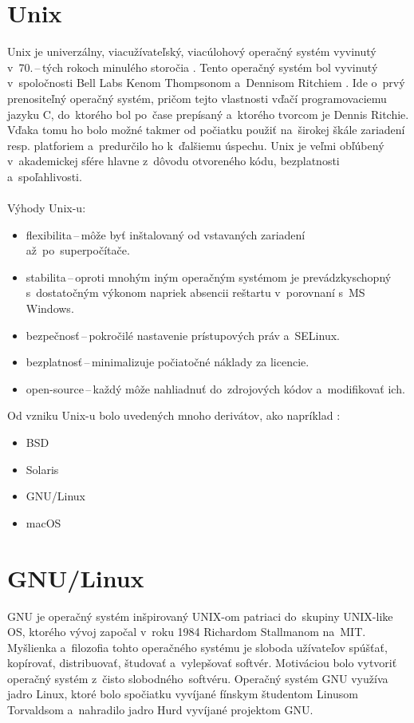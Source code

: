 \section{Unix}
Unix je univerzálny, viacužívateľský, viacúlohový operačný systém vyvinutý v~70.\,--\,tých rokoch minulého storočia \cite{unix-root}. Tento operačný systém bol vyvinutý v~spoločnosti Bell Labs Kenom Thompsonom a~Dennisom Ritchiem \cite{unix-root}. Ide o~prvý prenositeľný operačný systém, pričom tejto vlastnosti vďačí programovaciemu jazyku C, do~ktorého bol po~čase prepísaný a~ktorého tvorcom je Dennis Ritchie. Vďaka tomu ho bolo možné takmer od počiatku použiť na~širokej škále zariadení resp. platforiem a~predurčilo ho k~ďalšiemu úspechu. Unix je veľmi obľúbený v~akademickej sfére hlavne z~dôvodu otvoreného kódu, bezplatnosti a~spoľahlivosti.
\\\\
\noindent Výhody Unix-u:
\begin{itemize}
	\item flexibilita\,--\,môže byť inštalovaný od vstavaných zariadení až~po~superpočítače.  
	\item stabilita\,--\,oproti mnohým iným operačným systémom je prevádzkyschopný s~dostatočným výkonom napriek absencii reštartu v~porovnaní s~MS Windows.
	\item bezpečnosť\,--\,pokročilé nastavenie prístupových práv a~SELinux.
	\item bezplatnosť\,--\,minimalizuje počiatočné náklady za licencie.
	\item open-source\,--\,každý môže nahliadnuť do~zdrojových kódov a~modifikovať ich.
\end{itemize} 

\noindent Od vzniku Unix-u bolo uvedených mnoho derivátov, ako napríklad \cite{unix-based}:
\begin{itemize}
	\item BSD
	\item Solaris
	\item GNU/Linux
	\item macOS
\end{itemize}
\section{GNU/Linux}
GNU je operačný systém inšpirovaný UNIX-om patriaci do~skupiny UNIX-like OS, ktorého vývoj započal v~roku 1984  Richardom Stallmanom na~MIT. Myšlienka a~filozofia tohto operačného systému je sloboda užívateľov spúšťať, kopírovať, distribuovať, študovať a~vylepšovať softvér. Motiváciou bolo vytvoriť operačný systém z~čisto slobodného~\mbox{softvéru}. Operačný systém GNU využíva jadro Linux, ktoré bolo spočiatku vyvíjané fínskym študentom Linusom Torvaldsom a~nahradilo jadro Hurd vyvíjané projektom GNU. \cite{gnu}

